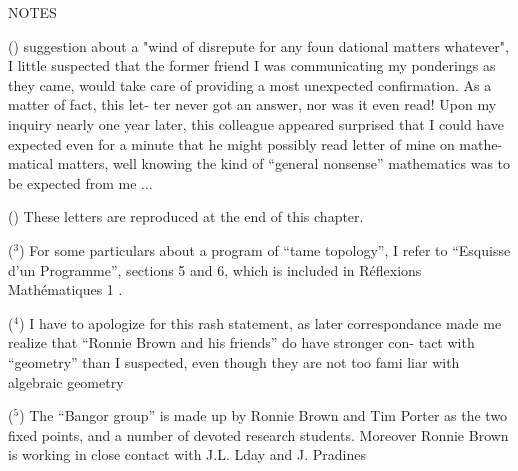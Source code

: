 
NOTES 


()   suggestion about  a "wind of disrepute for any foun%
\hand{-}dational matters whatever", I little suspected that the former friend  
I was  communicating my ponderings as they came, would take care of 
providing a most unexpected confirmation. As a matter of fact, this let-%
ter never got an answer, nor was it even read! Upon my inquiry nearly one
year later, this colleague appeared  surprised that  I could have expected
even for a minute that he might possibly read   letter of mine on mathe-%
matical matters, well knowing the kind of ``general nonsense'' mathematics
 was to be expected from me ...

() These letters are reproduced  at the end of this chapter.

($^3$) For some particulars about a program of ``tame topology'', I refer to
``Esquisse d'un Programme'', sections 5 and 6, which is included in
Réflexions Mathématiques 1 .

($^4$) I have to apologize for this rash statement, as later correspondance
made me realize that ``Ronnie Brown and his friends'' do have stronger con-%
tact with ``geometry'' than I suspected, even though they are not too fami\hand{\unsure{-}}%
liar with algebraic geometry\hand{!}

($^5$) The ``Bangor group'' is made up by Ronnie Brown and Tim Porter as the
two fixed points, and a number of devoted research students. Moreover
Ronnie Brown is working in close contact with J.L. Lday and J. Pradines

